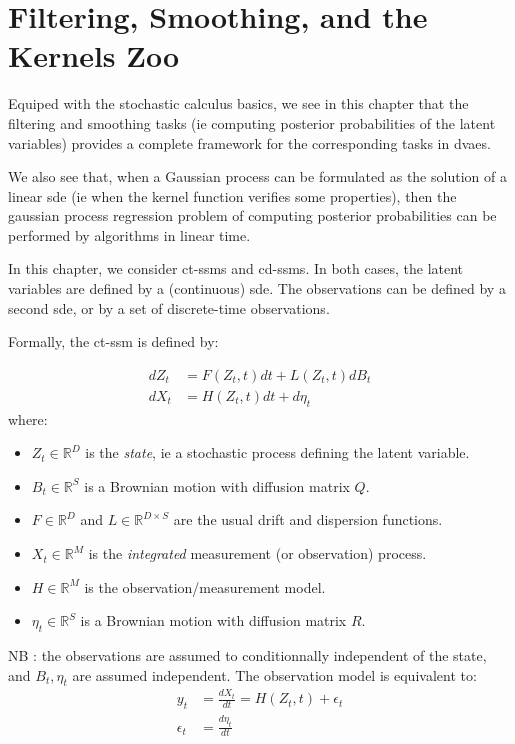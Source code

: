 \chapter{Filtering, Smoothing, and the Kernels Zoo}\label{sec:filter smoother gps}

Equiped with the stochastic calculus basics, we see in this chapter that the filtering and smoothing 
tasks (ie computing posterior probabilities of the latent variables) provides a complete framework 
for the corresponding tasks in \glspl{dvae}.

We also see that, when a Gaussian process can be formulated as the solution of a linear \gls{sde} (ie
 when the kernel function verifies some properties), then the gaussian process regression problem 
 of computing posterior probabilities can be performed by algorithms in linear time.

In this chapter, we consider \glspl{ct-ssm} and \glspl{cd-ssm}. In both cases, the latent variables are 
defined by a (continuous) \gls{sde}. The observations can be defined by a second \gls{sde}, or by a set of 
discrete-time observations.

Formally, the \gls{ct-ssm} is defined by:

\begin{tcolorbox}[colback=blue!5!white,colframe=black!75!black,title=Continuous-Time State Space model]
    \begin{align}
        dZ_t &= F(Z_t, t)dt + L(Z_t,t) dB_t \\
        dX_t &= H(Z_t,t)dt + d\eta_t
    \end{align}
    where:
    \begin{itemize}
        \item $Z_t \in \mathbb{R}^{D}$ is the \textit{state}, ie a stochastic process defining the latent variable.
        \item $B_t \in \mathbb{R}^{S}$ is a Brownian motion with diffusion matrix $Q$.
        \item $F \in \mathbb{R}^{D}$ and $L \in \mathbb{R}^{D \times S}$ are the usual drift and dispersion functions.
        \item $X_t \in \mathbb{R}^{M}$ is the \textit{integrated} measurement (or observation) process.
        \item $H \in \mathbb{R}^{M}$ is the observation/measurement model.
        \item $\eta_t \in \mathbb{R}^{S}$ is a Brownian motion with diffusion matrix $R$.
    \end{itemize}
    NB : the observations are assumed to conditionnally independent of the state, and $B_t, \eta_t$ are 
     assumed independent.
    The observation model is equivalent to:
    \begin{align}
        y_t &= \frac{dX_t}{dt} = H(Z_t,t) + \epsilon_t \\
        \epsilon_t &= \frac{d \eta_t}{dt}
    \end{align}
\end{tcolorbox}

